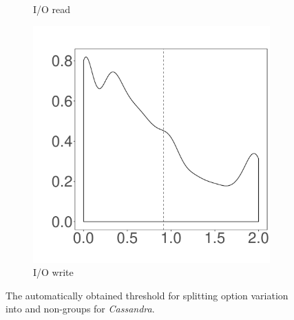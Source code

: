 \begin{figure}[t]
\begin{subfigure}{0.19\textwidth}
                \caption{I/O read}
        \end{subfigure}
        \begin{subfigure}{0.19\textwidth}
                \includegraphics[width=\linewidth]{Figures/iowrite-cassandra-cluster.pdf}
                \caption{I/O write}
        \end{subfigure}
        
	\caption{The automatically obtained threshold for splitting option variation into \inconsistent and non-\inconsistent groups for \emph{Cassandra}.} %
	\label{fig:threshold_cassandra}
\end{figure}
